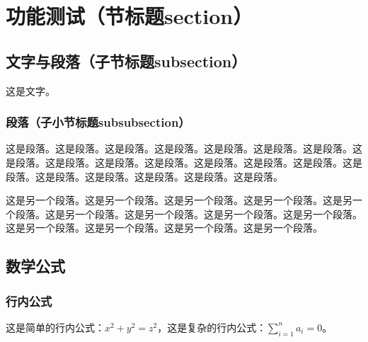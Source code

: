 \documentclass[UTF8, zihao = -4, linespread = 1.335, heading = true, fontset = fandol]{ctexart}
\begin{document}





\transbody
\pagestyle{ujntranslation}


\section{功能测试（节标题section）}
\subsection{文字与段落（子节标题subsection）}
这是文字。
\subsubsection{段落（子小节标题subsubsection）}
这是段落。这是段落。这是段落。这是段落。这是段落。这是段落。这是段落。这是段落。这是段落。这是段落。这是段落。这是段落。这是段落。这是段落。这是段落。这是段落。这是段落。这是段落。这是段落。这是段落。

这是另一个段落。这是另一个段落。这是另一个段落。这是另一个段落。这是另一个段落。这是另一个段落。这是另一个段落。这是另一个段落。这是另一个段落。这是另一个段落。这是另一个段落。这是另一个段落。这是另一个段落。
\subsection{数学公式}
\subsubsection{行内公式}
这是简单的行内公式：$x^2+y^2=z^2$，这是复杂的行内公式：$\sum_{i=1}^n a_i=0$。
\end{document}

